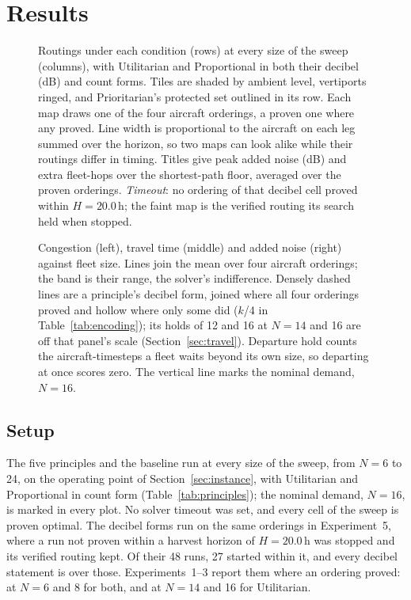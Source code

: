\section{Results}
\label{sec:results}

\begin{figure}[p]
\centering

\caption{Routings under each condition (rows) at every size of the sweep (columns), with
Utilitarian and Proportional in both their decibel (dB) and count forms. Tiles are shaded
by ambient level, vertiports ringed, and Prioritarian's protected set outlined in its
row. Each map
draws one of the four aircraft orderings, a proven one where any proved. Line width is
proportional to the aircraft on each leg summed over the horizon, so two maps can look
alike while their routings differ in timing. Titles give peak added noise (dB) and extra
fleet-hops over the shortest-path floor, averaged over the proven orderings.
\emph{Timeout}: no ordering of that decibel cell proved within $H=20.0$\,h; the faint map
is the verified routing its search held when stopped.}
\label{fig:routes-grid}
\end{figure}

\begin{figure}[t]
\centering

\caption{Congestion (left), travel time (middle) and added noise (right) against fleet
size. Lines join the mean over four aircraft orderings; the band is their range, the
solver's indifference. Densely dashed lines are a principle's decibel form, joined where
all four orderings proved and hollow where only some did ($k$/4 in
Table~\ref{tab:encoding}); its holds of 12 and 16 at $N=14$ and 16 are off that panel's
scale (Section~\ref{sec:travel}). Departure hold counts the aircraft-timesteps a fleet
waits beyond its own size, so departing at once scores zero. The vertical line marks the
nominal demand, $N=16$.}
\label{fig:metric-vs-N}
\end{figure}

\subsection{Setup}
\label{sec:setup}

The five principles and the baseline run at every size of the sweep, from $N=6$ to 24,
on the operating point of Section~\ref{sec:instance}, with Utilitarian and Proportional in
count form (Table~\ref{tab:principles}); the nominal demand, $N=16$, is marked in every
plot. No solver timeout was set, and every cell of the sweep is proven optimal. The decibel
forms run on the same orderings in Experiment~5, where a run not proven within a harvest
horizon of $H=20.0$\,h was stopped and its verified routing kept. Of their 48 runs,
27 started within it, and every decibel statement is over those. Experiments~1--3 report them where an ordering proved: at $N=6$ and 8 for both, and at
$N=14$ and 16 for Utilitarian.

